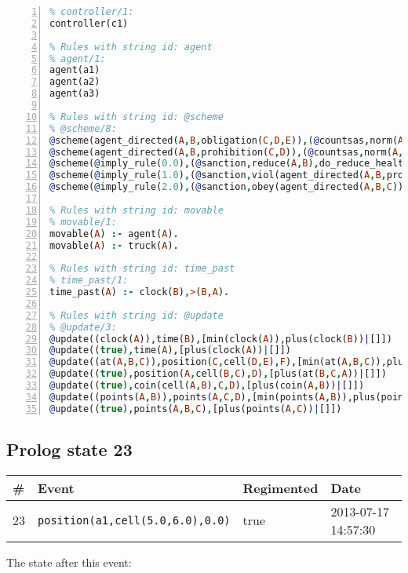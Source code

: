\documentclass[11pt]{article}\usepackage[utf8]{inputenc}\usepackage{geometry}
\begin{document}
\begin{lstlisting}[language=Prolog, numbers=left]
% Rules with string id: controller
% controller/1:
controller(c1)

% Rules with string id: agent
% agent/1:
agent(a1)
agent(a2)
agent(a3)

% Rules with string id: @scheme
% @scheme/8:
@scheme(agent_directed(A,B,obligation(C,D,E)),(@countsas,norm(A,B,F,obligation(C,D,E)),F),false,(listTrue(C)),(time_past(D)),false,[plus(viol(agent_directed(A,B,obligation(C,D,E))))|[]],[plus(obey(agent_directed(A,B,obligation(C,D,E))))|[]])
@scheme(agent_directed(A,B,prohibition(C,D)),(@countsas,norm(A,B,E,prohibition(C,D)),E),(listTrue(C)),false,(false),false,[plus(viol(agent_directed(A,B,prohibition(C,D))))|[]],[plus(obey(agent_directed(A,B,prohibition(C,D))))|[]])
@scheme(@imply_rule(0.0),(@sanction,reduce(A,B),do_reduce_health(A,B),notifyAgent(A,changed(status))),true,false,false,false,[min(reduce(A,B))|[]],[])
@scheme(@imply_rule(1.0),(@sanction,viol(agent_directed(A,B,prohibition(C,D))),do_sanction(D)),true,false,false,false,[min(viol(agent_directed(A,B,prohibition(C,D))))|[]],[])
@scheme(@imply_rule(2.0),(@sanction,obey(agent_directed(A,B,C))),true,false,false,false,[min(obey(agent_directed(A,B,C)))|[]],[])

% Rules with string id: movable
% movable/1:
movable(A) :- agent(A).
movable(A) :- truck(A).

% Rules with string id: time_past
% time_past/1:
time_past(A) :- clock(B),>(B,A).

% Rules with string id: @update
% @update/3:
@update((clock(A)),time(B),[min(clock(A)),plus(clock(B))|[]])
@update((true),time(A),[plus(clock(A))|[]])
@update((at(A,B,C)),position(C,cell(D,E),F),[min(at(A,B,C)),plus(at(D,E,C))|[]])
@update((true),position(A,cell(B,C),D),[plus(at(B,C,A))|[]])
@update((true),coin(cell(A,B),C,D),[plus(coin(A,B))|[]])
@update((points(A,B)),points(A,C,D),[min(points(A,B)),plus(points(A,D))|[]])
@update((true),points(A,B,C),[plus(points(A,C))|[]])

\end{lstlisting}
\clearpage 
\subsection{Prolog state 23}
\begin{table}[ht]
\centering 
\begin{tabular}{l l l l} 
\textbf{\#} & \textbf{Event} & \textbf{Regimented} & \textbf{Date} \\ [0.5ex] 
\hline
23&\texttt{position(a1,cell(5.0,6.0),0.0)}&true&2013-07-17 14:57:30\\ [1ex] \hline\end{tabular}
\end{table}
The state after this event:
\end{document}
